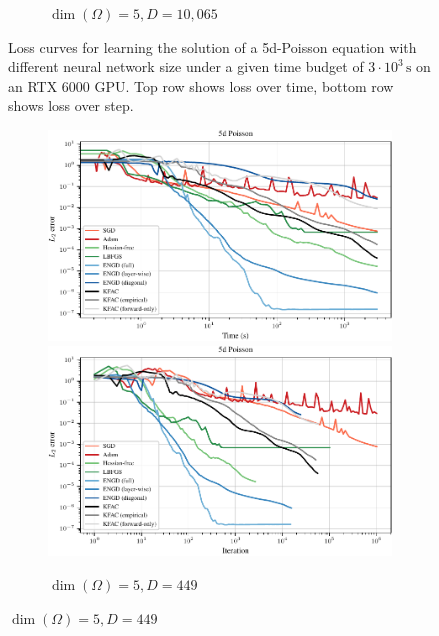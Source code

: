 \begin{figure}[!h]
\begin{subfigure}{0.325\linewidth}
    \caption{$\dim(\Omega) = 5, D = 10,065$}
  \end{subfigure}
  \caption{Loss curves for learning the solution of a 5d-Poisson equation with different neural network size under a given time budget of $3\cdot 10^3\,\text{s}$ on an RTX 6000 GPU.
    Top row shows loss over time, bottom row shows loss over step.
    }
\end{figure}

\begin{figure}[!h]
  \centering
  \begin{subfigure}{0.325\linewidth}
    \includegraphics[width=\linewidth]{../kfac_pinns_exp/exp10_reproduce_poisson5d/l2_error_over_time}
    \\
    \includegraphics[width=\linewidth]{../kfac_pinns_exp/exp10_reproduce_poisson5d/l2_error_over_step}
    \caption{$\dim(\Omega) = 5, D = 449$}
  \end{subfigure}

\end{figure}

